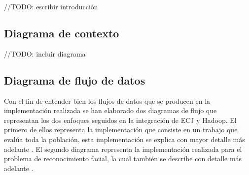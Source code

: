 //TODO: escribir introducción

\subsection{Diagrama de contexto}

//TODO: incluir diagrama


\subsection{Diagrama de flujo de datos}

Con el fin de entender bien los flujos de datos que se producen en la implementaci\'on realizada se han elaborado dos diagramas de flujo que representan los dos enfoques seguidos en la integraci\'on de ECJ y Hadoop. El primero de ellos  representa la implementación que consiste en un trabajo que eval\'ua toda la población, esta implementación se explica con mayor detalle m\'as adelante . El segundo diagrama representa la implementación realizada para el problema de reconocimiento facial, la cual también se describe con detalle m\'as adelante .


